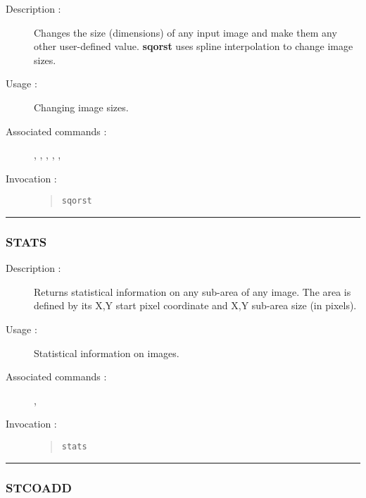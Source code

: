 \begin{description}

\item[Description :] Changes the size (dimensions) of any input image
and make them any other user-defined value.  {\bf sqorst} uses spline
interpolation to change image sizes.

\item[Usage :] Changing image sizes.

\item[Associated commands :] {\tt {}}, 
{\tt {}}, {\tt {}}, 
{\tt {}}, {\tt {}}, 
{\tt {}}

\item[Invocation :]

\begin{quote}{\tt  sqorst }\end{quote}

\end{description}

\hrule 
\subsubsection*{\label{STATS}STATS}

\begin{description}

\item[Description :] Returns statistical information on any sub-area of
any image. The area is defined by its X,Y start pixel coordinate and
X,Y sub-area size (in pixels).

\item[Usage :] Statistical information on images.
\item[Associated commands :] {\tt {}}, 
{\tt {}}
\item[Invocation :]

\begin{quote}{\tt  stats }\end{quote}

\end{description}

\hrule 
\subsubsection*{\label{STCOADD}STCOADD}

